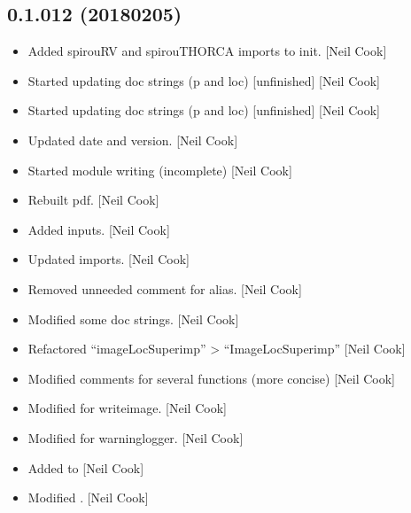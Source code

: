 \documentclass[a4paper,10pt,english]{report}
\begin{document}
\subsection{0.1.012 (2018\sphinxhyphen{}02\sphinxhyphen{}05)}
\label{\detokenize{misc/changelog:id510}}\begin{itemize}
\item {} 
Added spirouRV and spirouTHORCA imports to init. {[}Neil Cook{]}

\item {} 
Started updating doc strings (p and loc) {[}unfinished{]} {[}Neil Cook{]}

\item {} 
Started updating doc strings (p and loc) {[}unfinished{]} {[}Neil Cook{]}

\item {} 
Updated date and version. {[}Neil Cook{]}

\item {} 
Started module writing (incomplete) {[}Neil Cook{]}

\item {} 
Rebuilt pdf. {[}Neil Cook{]}

\item {} 
Added inputs. {[}Neil Cook{]}

\item {} 
Updated imports. {[}Neil Cook{]}

\item {} 
Removed unneeded comment for alias. {[}Neil Cook{]}

\item {} 
Modified some doc strings. {[}Neil Cook{]}

\item {} 
Refactored “imageLocSuperimp” \textendash{}\textgreater{} “ImageLocSuperimp” {[}Neil Cook{]}

\item {} 
Modified comments for several functions (more concise) {[}Neil Cook{]}

\item {} 
Modified  for writeimage. {[}Neil Cook{]}

\item {} 
Modified  for warninglogger. {[}Neil Cook{]}

\item {} 
Added to  {[}Neil Cook{]}

\item {} 
Modified  . {[}Neil Cook{]}


\end{itemize}
\end{document}
